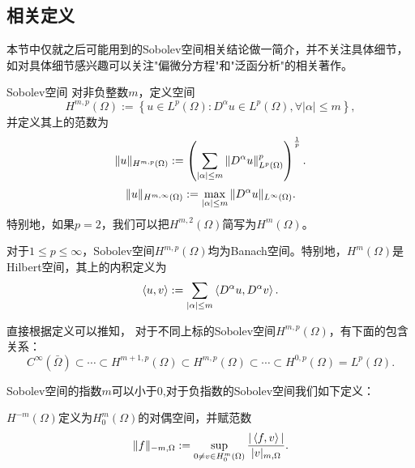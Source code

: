 \subsection{相关定义}
\begin{remark}
    本节中仅就之后可能用到的Sobolev空间相关结论做一简介，并不关注具体细节，如对具体细节感兴趣可以关注"偏微分方程"和"泛函分析"的相关著作。
\end{remark}
\begin{definition}{Sobolev空间}
    对非负整数$m$，定义空间
    \begin{equation}
        \label{eq:SobolevDef}
        H^{m,p}(\Omega):=\left\{u\in L^{p}(\Omega):D^{\alpha}u\in L^{p}(\Omega),\forall|\alpha|\le m\right\},
    \end{equation}
    并定义其上的范数为
    \begin{equation}
        \label{eq:SobolevNorm}
        \|u\|_{H^{m,p}(\Omega)}:=\left(\sum_{|\alpha|\le m}\|D^{\alpha}u\|_{L^{p}(\Omega)}^{p}\right)^{\frac{1}{p}}.
    \end{equation}
    \begin{equation}
        \label{eq:SobolevinfNorm}
        \|u\|_{H^{m,\infty}(\Omega)}:=\max_{|\alpha|\le m}\|D^{\alpha}u\|_{L^{\infty}(\Omega)}.
    \end{equation}
    特别地，如果$p=2$，我们可以把$H^{m,2}(\Omega)$简写为$H^{m}(\Omega)$。
\end{definition}
\begin{lemma}
    对于$1\le p\le\infty$，Sobolev空间$H^{m,p}(\Omega)$均为Banach空间。特别地，$H^{m}(\Omega)$是Hilbert空间，其上的内积定义为
    \begin{equation}
        \label{eq:innerprodsobolev}
        \left<u,v\right>:=\sum_{|\alpha|\le m}\left<D^{\alpha}u,D^{\alpha}v\right>.
    \end{equation}
\end{lemma}
\begin{proposition}
    直接根据定义可以推知，
    对于不同上标的Sobolev空间$H^{m,p}(\Omega)$，有下面的包含关系：
    \begin{equation}
        C^{\infty}(\bar{\Omega})\subset\cdots\subset H^{m+1,p}(\Omega)\subset H^{m,p}(\Omega)\subset\cdots\subset H^{0,p}(\Omega)=L^{p}(\Omega).
    \end{equation}
\end{proposition}
Sobolev空间的指数$m$可以小于0,对于负指数的Sobolev空间我们如下定义：
\begin{definition}
    $H^{-m}(\Omega)$定义为$H_{0}^{m}(\Omega)$的对偶空间，并赋范数
    \begin{equation}
        \|f\|_{-m,\Omega}:=\sup_{0\neq v\in H_{0}^{m}(\Omega)}\frac{|\left<f,v\right>|}{|v|_{m,\Omega}}.
    \end{equation}
\end{definition}
